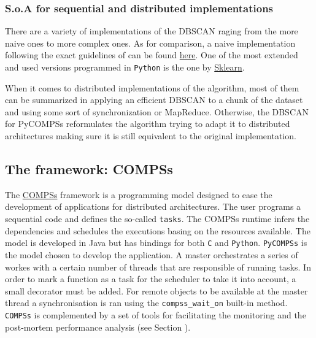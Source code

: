 \documentclass[10pt,journal,compsoc]{IEEEtran}
\begin{document}
\subsubsection{S.o.A for sequential and distributed implementations}


There are a variety of implementations of the DBSCAN raging from the more naive ones to more complex ones. As for comparison, a naive implementation following the exact guidelines of \cite{ReferencePaper} can be found \href{https://github.com/csegarragonz/DBSCAN-pyCOMPSs/blob/master/ext_versions/DBSCAN_Seq.py}{here}. One of the most extended and used versions programmed in \texttt{Python} is the one by \href{http://scikit-learn.org/stable/modules/generated/sklearn.cluster.DBSCAN.html}{Sklearn}.

When it comes to distributed implementations of the algorithm, most of them can be summarized in applying an efficient DBSCAN to a chunk of the dataset and using some sort of synchronization or MapReduce. Otherwise, the DBSCAN for PyCOMPSs reformulates the algorithm trying to adapt it to distributed architectures making sure it is still equivalent to the original implementation.

\subsection{The framework: COMPSs} \label{subec:compss_framework}


The \href{https://www.bsc.es/research-and-development/software-and-apps/software-list/comp-superscalar}{COMPSs} framework\cite{compss} is a programming model designed to ease the development of applications for distributed architectures. The user programs a sequential code and defines the so-called \texttt{tasks}. The COMPSs runtime infers the dependencies and schedules the executions basing on the resources available. The model is developed in Java but has bindings for both \texttt{C} and \texttt{Python}. \texttt{PyCOMPSs}\cite{pycompss} is the model chosen to develop the application. A master orchestrates a series of workes with a certain number of threads that are responsible of running tasks. In order to mark a function as a task for the scheduler to take it into account, a small decorator must be added. For remote objects to be available at the master thread a synchronisation is ran using the \texttt{compss\_wait\_on} built-in method. \texttt{COMPSs} is complemented by a set of tools for facilitating the monitoring and the post-mortem performance analysis (see Section ).
\end{document}
